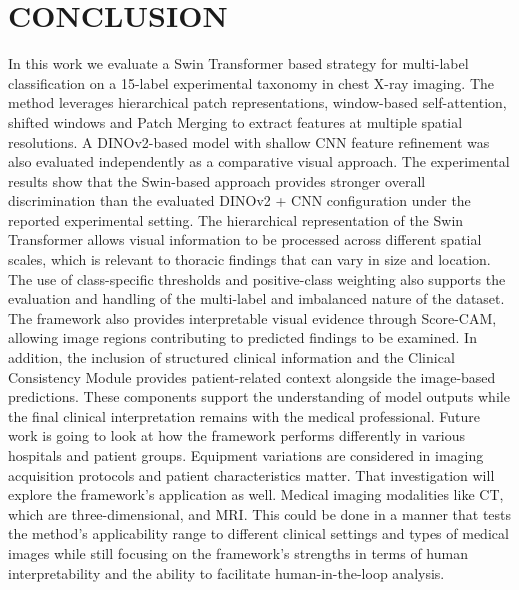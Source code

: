 \documentclass[conference]{IEEEtran}
\begin{document}
\FloatBarrier
\section{CONCLUSION}
In this work we evaluate a Swin Transformer based strategy for multi-label
classification on a 15-label experimental taxonomy in chest X-ray
imaging. The method leverages hierarchical patch representations,
window-based self-attention, shifted windows and Patch Merging
to extract features at multiple spatial resolutions. A DINOv2-based model with shallow CNN feature refinement was also evaluated independently as a comparative visual approach.
The experimental results show that the Swin-based approach provides stronger overall discrimination than the evaluated DINOv2 + CNN configuration under the reported experimental setting. The hierarchical representation of the Swin Transformer allows visual information to be processed across different spatial scales, which is relevant to thoracic findings that can vary in size and location. The use of class-specific thresholds and positive-class weighting also supports the evaluation and handling of the multi-label and imbalanced nature of the dataset.
The framework also provides interpretable visual evidence through Score-CAM, allowing image regions contributing to predicted findings to be examined. In addition, the inclusion of structured clinical information and the Clinical Consistency Module provides patient-related context alongside the image-based predictions. These components support the understanding of model outputs while the final clinical interpretation remains with the medical professional.
Future work is going to look at how the framework performs differently in various hospitals and patient groups. Equipment variations are considered in imaging acquisition protocols and patient characteristics matter. That investigation will explore the framework's application as well. Medical imaging modalities like CT, which are three-dimensional, and MRI. This could be done in a manner that tests the method's applicability range to different clinical settings and types of medical images while still focusing on the framework's strengths in terms of human interpretability and the ability to facilitate human-in-the-loop analysis.
\end{document}
